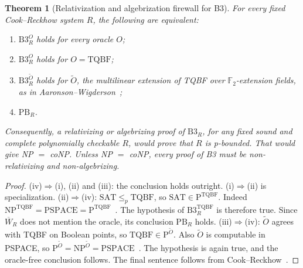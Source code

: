 \documentclass[11pt]{article}
\newtheorem{theorem}{Theorem}
\theoremstyle{definition}
\begin{document}
\begin{theorem}[Relativization and algebrization firewall for B3]\label{thm:rel}
For every fixed Cook--Reckhow system $R$, the following are equivalent:
\begin{enumerate}
\item[(i)] $\mathrm{B3}^O_R$ holds for every oracle $O$;
\item[(ii)] $\mathrm{B3}^{O}_R$ holds for $O=\mathrm{TQBF}$;
\item[(iii)] $\mathrm{B3}^{\widetilde O}_R$ holds for $\widetilde O$, the multilinear
extension of TQBF over $\mathbb F_2$-extension fields, as in Aaronson--Wigderson~\cite{AW09};
\item[(iv)] $\mathrm{PB}_R$.
\end{enumerate}
Consequently, a relativizing or algebrizing proof of $\mathrm{B3}_R$, for \emph{any}
fixed sound and complete polynomially checkable $R$, would prove that $R$ is p-bounded.
That would give NP $=$ coNP. Unless NP $=$ coNP, every proof of B3 must be
non-relativizing and non-algebrizing.
\end{theorem}
\begin{proof}
(iv)$\Rightarrow$(i), (ii) and (iii): the conclusion holds outright.
(i)$\Rightarrow$(ii) is specialization.
(ii)$\Rightarrow$(iv): $\mathrm{SAT}\le_p\mathrm{TQBF}$, so $\mathrm{SAT}\in\mathrm P^{\mathrm{TQBF}}$.
Indeed $\mathrm{NP}^{\mathrm{TQBF}}=\mathrm{PSPACE}=\mathrm P^{\mathrm{TQBF}}$~\cite{BGS75}.
The hypothesis of $\mathrm{B3}^{\mathrm{TQBF}}_R$ is therefore true. Since $\overline W_R$
does not mention the oracle, its conclusion $\mathrm{PB}_R$ holds.
(iii)$\Rightarrow$(iv): $\widetilde O$ agrees with TQBF on Boolean points, so
$\mathrm{TQBF}\in\mathrm P^{\widetilde O}$. Also $\widetilde O$ is computable in PSPACE,
so $\mathrm P^{\widetilde O}=\mathrm{NP}^{\widetilde O}=\mathrm{PSPACE}$~\cite{AW09}.
The hypothesis is again true, and the oracle-free conclusion follows.
The final sentence follows from Cook--Reckhow~\cite{CR79}.
\end{proof}
\end{document}
